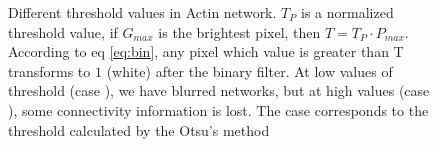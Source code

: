 \begin{figure}[h]
\begin{minipage}{0.55\textwidth}
\hspace{1pt}
\end{minipage}

\caption[Different threshold values on networks]{Different threshold values in
Actin network.
$T_P$ is a normalized threshold value, if $G_{max}$ is the brightest pixel, then
$T=T_P\cdot P_{max}$. According to eq \ref{eq:bin}, any pixel which value is greater than T transforms to $1$
(white) after the binary filter.
At low values of threshold (case ), we have blurred networks, but
at high values (case ), some connectivity information is lost.
The case  corresponds to the threshold calculated by the Otsu's
method } 
\label{fig:binary}
\end{figure}

